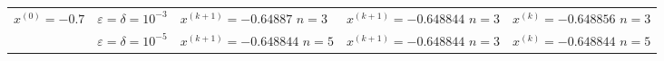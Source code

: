 \begin{table}[h!]
\begin{tabular}{|p{12ex}|l|p{20ex}|p{20ex}|p{20ex}|}
		\(x^{(0)} = -0.7\)                        &                                                                                                               %
		\(\varepsilon = \delta = 10^{-3} \)       &                                                                                                               %
		\(x^{(k+1)}=-0.64887 \) \newline \(n=3 \) &                                                                                                               %
		\(x^{(k+1)}=-0.648844\) \newline \(n=3 \) &                                                                                                               %
		\(x^{(k)}=-0.648856\) \newline \(n=3 \)                                                                                                                   \\ \cline{2-5}
		                                          & \(\varepsilon = \delta = 10^{-5} \) &                                                                         %
		\(x^{(k+1)}=-0.648844\) \newline \(n=5\)  &                                                                                                               %
		\(x^{(k+1)}=-0.648844\) \newline \(n=3 \) &                                                                                                               %
		\(x^{(k)}=-0.648844\) \newline \(n=5 \)                                                                                                                   \\ \hline


\end{tabular}
\end{table}
